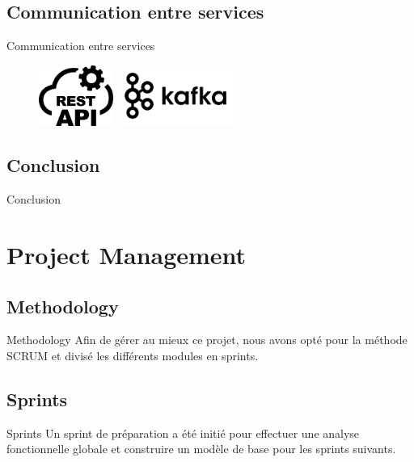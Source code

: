 \documentclass{beamer}
\begin{document}
\subsection{Communication entre services}
\begin{frame}{Communication entre services}
   \begin{figure}[htpb]
        \centering
        \includegraphics[height=2cm]{pic/rest.png}
         \hspace{0.1\textwidth}
         \includegraphics[height=2cm]{pic/kafka.png}
    \end{figure}
\end{frame}

\subsection{Conclusion}
\begin{frame}{Conclusion}
 
\end{frame}

\section{Project Management}

\subsection{Methodology}
\begin{frame}{Methodology}
    Afin de gérer au mieux ce projet, nous avons opté pour la méthode SCRUM et divisé les différents modules en sprints.
\end{frame}

\subsection{Sprints}
\begin{frame}{Sprints}
    Un sprint de préparation a été initié pour effectuer une analyse fonctionnelle globale et construire un modèle de base pour les sprints suivants.
\end{frame}
\end{document}
